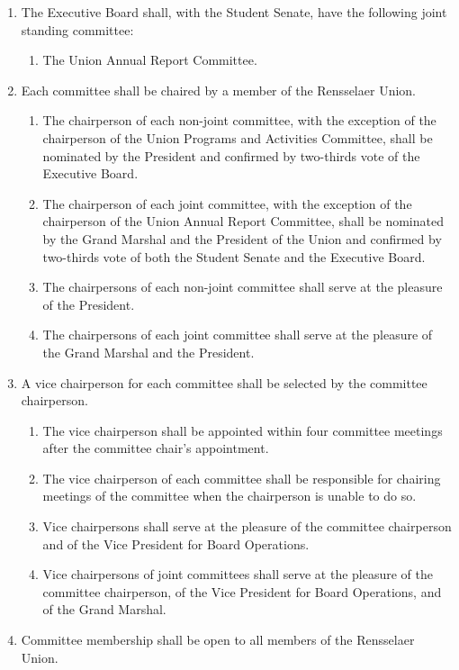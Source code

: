 \documentclass{uniondoc}
\begin{document}
\begin{enumerate}
\begin{enumerate}
  \end{enumerate}
\item The Executive Board shall, with the Student Senate, have the following joint standing committee:
  \begin{enumerate}
  \item The Union Annual Report Committee.
  \end{enumerate}
\item Each committee shall be chaired by a member of the Rensselaer Union.
  \begin{enumerate}
  \item The chairperson of each non-joint committee, with the exception of the chairperson of the Union Programs and Activities Committee, shall be nominated by the President and confirmed by two-thirds vote of the Executive Board.
  \item The chairperson of each joint committee, with the exception of the chairperson of the Union Annual Report Committee, shall be nominated by the Grand Marshal and the President of the Union and confirmed by two-thirds vote of both the Student Senate and the Executive Board.
  \item The chairpersons of each non-joint committee shall serve at the pleasure of the President.
  \item The chairpersons of each joint committee shall serve at the pleasure of the Grand Marshal and the President.
  \end{enumerate}
\item A vice chairperson for each committee shall be selected by the committee chairperson.
  \begin{enumerate}
  \item The vice chairperson shall be appointed within four committee meetings after the committee chair’s appointment.
  \item The vice chairperson of each committee shall be responsible for chairing meetings of the committee when the chairperson is unable to do so.
  \item Vice chairpersons shall serve at the pleasure of the committee chairperson and of the Vice President for Board Operations.
  \item Vice chairpersons of joint committees shall serve at the pleasure of the committee chairperson, of the Vice President for Board Operations, and of the Grand Marshal.
  \end{enumerate}
\item Committee membership shall be open to all members of the Rensselaer Union.

\end{enumerate}
\end{document}
